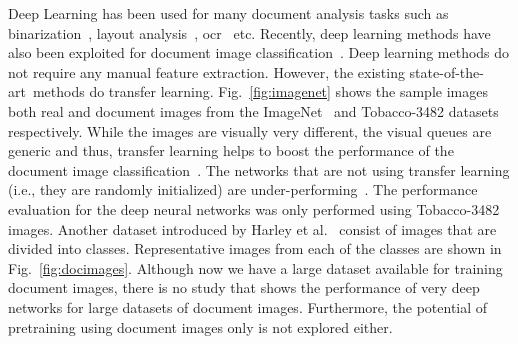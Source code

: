 \documentclass[conference]{IEEEtran}
\newcommand*{\sota}		{state-of-the-art\ }
\begin{document}
\begin{figure*}
\begin{subfigure}{.12\linewidth}
  \centering
\end{subfigure}
\begin{subfigure}{.12\linewidth}
  \centering
\end{subfigure}
\begin{subfigure}{.12\linewidth}
  \centering
\end{subfigure}
\begin{subfigure}{.12\linewidth}
  \centering
\end{subfigure}
\begin{subfigure}{.12\linewidth}
  \centering
\end{subfigure}
\caption{Sample images from the RVL-CDIP dataset. One image from each class is depicted. From left to right: \emph{Letter}, \emph{Form}, \emph{Email}, \emph{Handwritten}, \emph{Advertisement}, \emph{Scientific report}, \emph{Scientific publication}, \emph{Specification}, \emph{File folder}, \emph{News article}, \emph{Budget}, \emph{Invoice}, \emph{Presentation}, \emph{Questionnaire}, \emph{Resume}, \emph{Memo}}
\label{fig:docimages}
\end{figure*}


Deep Learning has been used for many document analysis tasks such as binarization~\cite{afzal2015documentbin, pastor2015insights}, layout analysis~\cite{pastor2016complete, seuret2017pca}, \ac{ocr}~\cite{liwicki2007novel, breuel2013high, ahmad2015scale, ahmed2016evaluation, ahmed2016generic, ul2015sequence} etc.
Recently, deep learning methods have also been exploited for document image classification~\cite{afzal2015deepdocclassifier, lekang_14_a, harley2015evaluation}.
Deep learning methods do not require any manual feature extraction.
However, the existing \sota methods do transfer learning. 
Fig.~\ref{fig:imagenet} shows the sample images both real and document images from the ImageNet~\cite{russakovsky2015imagenet} and Tobacco-3482 datasets respectively. 
While the images are visually very different, the visual queues are generic and thus, transfer learning helps to boost the performance of the document image classification~\cite{afzal2015deepdocclassifier, harley2015evaluation}.
The networks that are not using transfer learning (i.e., they are randomly initialized) are under-performing~\cite{lekang_14_a}.
The performance evaluation for the deep neural networks was only performed using Tobacco-3482 images. 
Another dataset introduced by Harley et al.~\cite{harley2015evaluation} consist of  images that are divided into  classes. Representative images from each of the classes are shown in Fig.~\ref{fig:docimages}.
Although now we have a large dataset available for training document images, there is no study that shows the performance of very deep networks for large datasets of document images. Furthermore, the potential of pretraining using document images only is not explored either.
\end{document}
